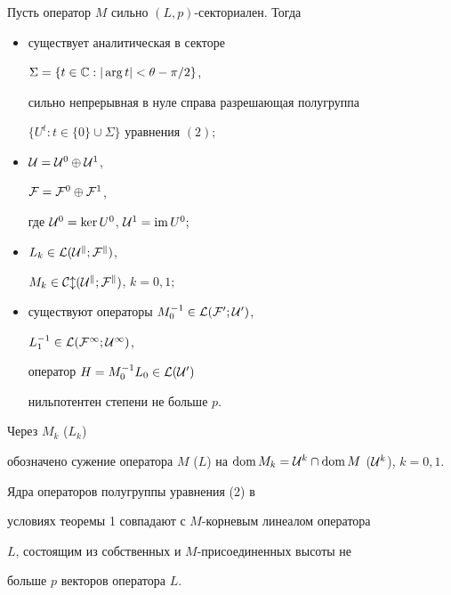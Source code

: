 \begin{thm}


Пусть оператор $M$ сильно $(L,p)$-секториален. Тогда 


\begin{itemize}


\item[(i)] существует аналитическая в секторе


$\Sigma =\{t\in{\Bbb C}: |\arg t|<\theta-\pi/2\}$,


сильно непрерывная в нуле справа разрешающая полугруппа 


$\{ U^t:t\in\{0\}\cup\Sigma \}$ уравнения $(2);$ 


\item[(ii)] ${\cal U}={\cal U}^0\oplus{\cal U}^1$,


${\cal F}={\cal F}^0\oplus {\cal F}^1$, 


где ${\cal U}^0=\ker U^0$, ${\cal U}^1=\operatorname{im} U^0;$


\item[(iii)] $L_k\in\cal L(\cal U^k;\cal F^k)$,


$M_k\in \cal C l(\cal U^k;\cal F^k)$, $k=0,1;$


\item[(iv)] существуют операторы $M_0^{-1}\in\cal L(\cal F^0;\cal U^0)$, 


$L_1^{-1}\in \cal L(\cal F^1;\cal U^1)$, 


оператор $H=M_0^{-1}L_0\in\cal L(\cal U^0)$


нильпотентен степени не больше $p$.


\end{itemize}


\end{thm}





Через $M_k$ ($L_k$)


обозначено сужение оператора $M$ ($L$) на $\dom M_k={\cal


U}^k\cap\dom M$ (${\cal U}^k$), $k=0,1$.








\begin{note}


Ядра операторов полугруппы уравнения (2) в


условиях теоремы 1 совпадают с $M$-корневым линеалом оператора


$L$, состоящим из собственных и $M$-присоединенных высоты не


больше $p$ векторов оператора $L$. 


\end{note}








